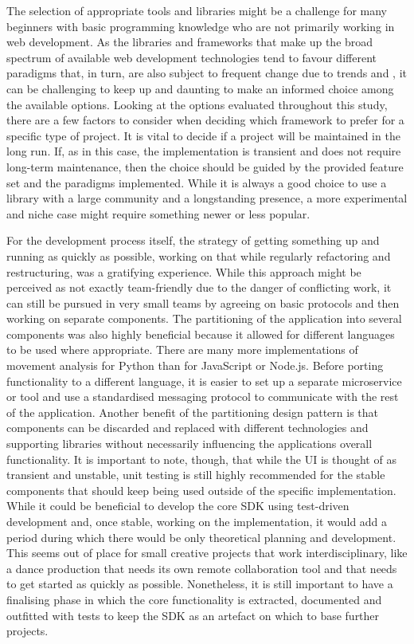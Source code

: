 The selection of appropriate tools and libraries might be a challenge for many beginners with basic programming knowledge who are not primarily working in web development.
As the libraries and frameworks that make up the broad spectrum of available web development technologies tend to favour different paradigms that, in turn, are also subject to frequent change due to trends and , it can be challenging to keep up and daunting to make an informed choice among the available options.
Looking at the options evaluated throughout this study, there are a few factors to consider when deciding which framework to prefer for a specific type of project.
It is vital to decide if a project will be maintained in the long run.
If, as in this case, the implementation is transient and does not require long-term maintenance, then the choice should be guided by the provided feature set and the paradigms implemented.
While it is always a good choice to use a library with a large community and a longstanding presence, a more experimental and niche case might require something newer or less popular.

For the development process itself, the strategy of getting something up and running as quickly as possible, working on that while regularly refactoring and restructuring, was a gratifying experience.
While this approach might be perceived as not exactly team-friendly due to the danger of conflicting work, it can still be pursued in very small teams by agreeing on basic protocols and then working on separate components.
The partitioning of the application into several components was also highly beneficial because it allowed for different languages to be used where appropriate.
There are many more implementations of movement analysis for Python than for JavaScript or Node.js.
Before porting functionality to a different language, it is easier to set up a separate microservice or tool and use a standardised messaging protocol to communicate with the rest of the application.
Another benefit of the partitioning design pattern is that components can be discarded and replaced with different technologies and supporting libraries without necessarily influencing the application\textquotesingle s overall functionality.
It is important to note, though, that while the \ac{UI} is thought of as transient and unstable, unit testing is still highly recommended for the stable components that should keep being used outside of the specific implementation.
While it could be beneficial to develop the core \ac{SDK} using test-driven development and, once stable, working on the implementation, it would add a period during which there would be only theoretical planning and development.
This seems out of place for small creative projects that work interdisciplinary, like a dance production that needs its own remote collaboration tool and that needs to get started as quickly as possible.
Nonetheless, it is still important to have a finalising phase in which the core functionality is extracted, documented and outfitted with tests to keep the \ac{SDK} as an artefact on which to base further projects.
